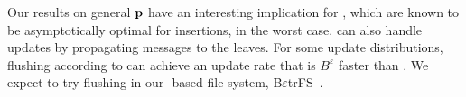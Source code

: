 Our results on general $\mathbf{p}$ have an interesting implication for \betrees{},
which are known to be asymptotically optimal for insertions, in the worst case.
\betrees{} can also handle updates by propagating messages to the leaves.  For
some update distributions, flushing according to \RB can achieve an update rate
that is $B^\varepsilon$ faster than \FB.  We expect to try \RB flushing in our
\betree{}-based file system,
B$\varepsilon$trFS~\cite{DBLP:journals/tos/JannenYZAEJMPRW15,DBLP:conf/fast/YuanZJPACDKWBFJ16,DBLP:conf/fast/ConwayBJJZYBJKP17,DBLP:conf/fast/JannenYZAEJMPRW15,DBLP:conf/hotstorage/EsmetBFK12}.



